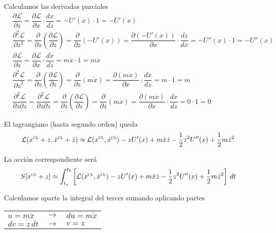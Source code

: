 Calculamos las derivadas parciales
\begin{align*}
  &\dfrac{\partial\mathcal{L}}{\partial z}
  = \dfrac{\partial\mathcal{L}}{\partial x}\cdot\dfrac{dx}{dz}
    = -U'(x)\cdot 1 = -U'(x)\\
  &\dfrac{\partial^2\mathcal{L}}{\partial z^2}
    = \dfrac{\partial}{\partial z} \left(\dfrac{\partial\mathcal{L}}{\partial z}\right)
    = \dfrac{\partial}{\partial z} \left(-U'(x)\right)
    = \dfrac{\partial (-U'(x))}{\partial x}\cdot\dfrac{dz}{dx}
    = -U''(x)\cdot 1
    = -U''(x)\\
  &\dfrac{\partial\mathcal{L}}{\partial\dot{z}}
  = \dfrac{\partial\mathcal{L}}{\partial\dot{x}}\cdot\dfrac{d\dot{x}}{d\dot{z}}
    = m\dot{x}\cdot 1 = m\dot{x}\\
  &\dfrac{\partial^2\mathcal{L}}{\partial \dot{z}^2}
    = \dfrac{\partial}{\partial\dot{z}} \left(\dfrac{\partial\mathcal{L}}{\partial\dot{z}}\right)
    = \dfrac{\partial}{\partial\dot{z}}\left(m\dot{x}\right)
    = \dfrac{\partial (m\dot{x})}{\partial\dot{x}}\cdot\dfrac{d\dot{x}}{d\dot{z}}
    = m\cdot 1
    = m\\
  &\dfrac{\partial^2\mathcal{L}}{\partial\dot{z} \partial z}
    = \dfrac{\partial^2\mathcal{L}}{\partial z \partial\dot{z}}
    = \dfrac{\partial}{\partial z} \left(\dfrac{\partial\mathcal{L}}{\partial\dot{z}}\right)
    = \dfrac{\partial}{\partial z}\left(m\dot{x}\right)
    = \dfrac{\partial (m\dot{x})}{\partial x}\cdot\dfrac{d x}{d z}
    = 0\cdot 1
    = 0
\end{align*}

El lagrangiano (hasta segundo orden) queda
\[
  \mathcal{L}(x^{\textsc{cl}}+z,\dot{x}^{\textsc{cl}}+\dot{z})
  \approx
  \mathcal{L}(x^{\textsc{cl}},\dot{x}^{\textsc{cl}})
  - z U'(x)
  + m\dot{x}\dot{z}
  - \dfrac{1}{2}z^2 U''(x)
  + \dfrac{1}{2}m\dot{z}^2
\]

La acción correspondiente será
\[
  S[x^{\textsc{cl}}+z]
  \approx
  \int_{t_a}^{t_b}
  \left[
    \mathcal{L}(x^{\textsc{cl}},\dot{x}^{\textsc{cl}})
  - z U'(x)
  + m\dot{x}\dot{z}
  - \dfrac{1}{2}z^2 U''(x)
  + \dfrac{1}{2}m\dot{z}^2
  \right]\,dt
\]

Calculamos aparte la integral del tercer sumando aplicando partes
\begin{center}
  \begin{tabular}{lcl}
    $u=m\dot{x}$
    &\hspace{1em}$\longrightarrow$\hspace{1em}
    &$du=m\ddot{x}$\\
    $dv=\dot{z}\,dt$
    &\hspace{1em}$\longrightarrow$\hspace{1em}
    &$v=z$
  \end{tabular}
\end{center}

